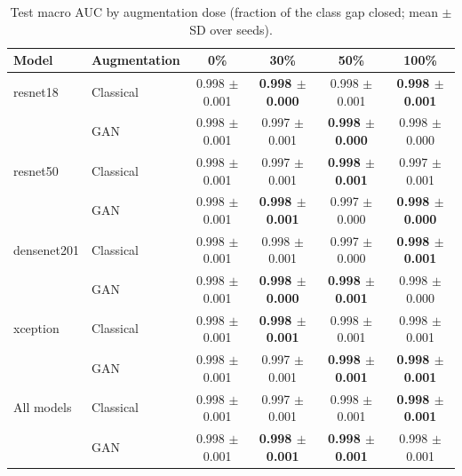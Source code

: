\begin{table}[htbp]
\centering
\caption{Test macro AUC by augmentation dose (fraction of the class gap closed; mean $\pm$ SD over seeds).}
\label{tab:dose_macro_auc}
\begin{tabular}{llcccc}
\toprule
Model & Augmentation & 0\% & 30\% & 50\% & 100\% \\
\midrule
resnet18 & Classical & 0.998 $\pm$ 0.001 & \textbf{0.998 $\pm$ 0.000} & 0.998 $\pm$ 0.001 & \textbf{0.998 $\pm$ 0.001} \\
 & GAN & 0.998 $\pm$ 0.001 & 0.997 $\pm$ 0.001 & \textbf{0.998 $\pm$ 0.000} & 0.998 $\pm$ 0.000 \\
\addlinespace
resnet50 & Classical & 0.998 $\pm$ 0.001 & 0.997 $\pm$ 0.001 & \textbf{0.998 $\pm$ 0.001} & 0.997 $\pm$ 0.001 \\
 & GAN & 0.998 $\pm$ 0.001 & \textbf{0.998 $\pm$ 0.001} & 0.997 $\pm$ 0.000 & \textbf{0.998 $\pm$ 0.000} \\
\addlinespace
densenet201 & Classical & 0.998 $\pm$ 0.001 & 0.998 $\pm$ 0.001 & 0.997 $\pm$ 0.000 & \textbf{0.998 $\pm$ 0.001} \\
 & GAN & 0.998 $\pm$ 0.001 & \textbf{0.998 $\pm$ 0.000} & \textbf{0.998 $\pm$ 0.001} & 0.998 $\pm$ 0.000 \\
\addlinespace
xception & Classical & 0.998 $\pm$ 0.001 & \textbf{0.998 $\pm$ 0.001} & 0.998 $\pm$ 0.001 & 0.998 $\pm$ 0.001 \\
 & GAN & 0.998 $\pm$ 0.001 & 0.997 $\pm$ 0.001 & \textbf{0.998 $\pm$ 0.001} & \textbf{0.998 $\pm$ 0.001} \\
\addlinespace
All models & Classical & 0.998 $\pm$ 0.001 & 0.997 $\pm$ 0.001 & 0.998 $\pm$ 0.001 & \textbf{0.998 $\pm$ 0.001} \\
 & GAN & 0.998 $\pm$ 0.001 & \textbf{0.998 $\pm$ 0.001} & \textbf{0.998 $\pm$ 0.001} & 0.998 $\pm$ 0.001 \\
\bottomrule
\end{tabular}
\end{table}
